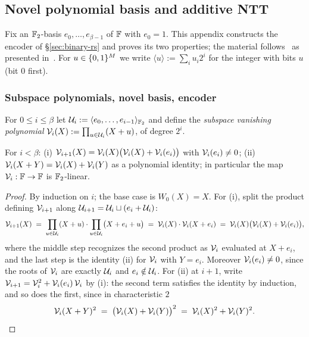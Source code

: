\subsection{Novel polynomial basis and additive NTT}\label{app:ntt}

Fix an $\mathbb{F}_2$-basis $e_0, \dots, e_{\beta-1}$ of $\mathbb{F}$ with $e_0 = 1$. This appendix constructs the encoder of \S\ref{sec:binary-rs} and proves its two properties; the material follows~\cite{LCH14} as presented in~\cite{DP26}. For $u \in \{0,1\}^{M}$ we write $\langle u \rangle := \sum_i u_i 2^i$ for the integer with bits $u$ (bit $0$ first).

\subsubsection{Subspace polynomials, novel basis, encoder}

For $0 \le i \le \beta$ let $\mathcal{U}_i := \langle e_0, \dots, e_{i-1} \rangle_{\mathbb{F}_2}$ and define the \emph{subspace vanishing polynomial} $\mathcal{V}_i(X) := \prod_{u \in \mathcal{U}_i}(X + u)$, of degree $2^i$.

\begin{lemma}\label{lem:subspace}
For $i < \beta$: (i) $\mathcal{V}_{i+1}(X) = \mathcal{V}_i(X)\bigl(\mathcal{V}_i(X) + \mathcal{V}_i(e_i)\bigr)$ with $\mathcal{V}_i(e_i) \neq 0$; (ii) $\mathcal{V}_i(X + Y) = \mathcal{V}_i(X) + \mathcal{V}_i(Y)$ as a polynomial identity; in particular the map $\mathcal{V}_i : \mathbb{F} \to \mathbb{F}$ is $\mathbb{F}_2$-linear.
\end{lemma}

\begin{proof}
By induction on $i$; the base case is $W_0(X) = X$. For (i), split the product defining $\mathcal{V}_{i+1}$ along $\mathcal{U}_{i+1} = \mathcal{U}_i \sqcup (e_i + \mathcal{U}_i)$:
\[
\mathcal{V}_{i+1}(X) \;=\; \prod_{u \in \mathcal{U}_i} (X + u) \cdot \prod_{u \in \mathcal{U}_i} \bigl(X + e_i + u\bigr) \;=\; \mathcal{V}_i(X) \cdot \mathcal{V}_i(X + e_i) \;=\; \mathcal{V}_i(X) \bigl( \mathcal{V}_i(X) + \mathcal{V}_i(e_i) \bigr),
\]
where the middle step recognizes the second product as $\mathcal{V}_i$ evaluated at $X + e_i$, and the last step is the identity (ii) for $\mathcal{V}_i$ with $Y = e_i$. Moreover $\mathcal{V}_i(e_i) \neq 0$, since the roots of $\mathcal{V}_i$ are exactly $\mathcal{U}_i$ and $e_i \notin \mathcal{U}_i$. For (ii) at $i + 1$, write $\mathcal{V}_{i+1} = \mathcal{V}_i^2 + \mathcal{V}_i(e_i)\, \mathcal{V}_i$ by (i): the second term satisfies the identity by induction, and so does the first, since in characteristic $2$
\[
\mathcal{V}_i(X+Y)^2 \;=\; \bigl(\mathcal{V}_i(X) + \mathcal{V}_i(Y)\bigr)^2 \;=\; \mathcal{V}_i(X)^2 + \mathcal{V}_i(Y)^2 . \qedhere
\]
\end{proof}


